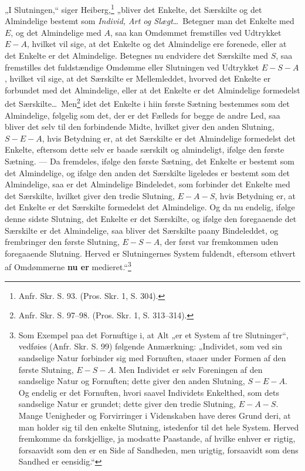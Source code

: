 \documentclass[11pt]{book}
\newcommand{\opage}[1]{\marginnote{\footnotesize\textit{[#1]}}}
\begin{document}
„I Slutningen,“ siger Heiberg,\footnote{Anfr. Skr. S. 93. (Pros. Skr.
1, S. 304).} „bliver det Enkelte, det Særskilte og det Almindelige
bestemt som \emph{Individ, Art og Slægt}\dots\ Betegner man det Enkelte
med $E$, og det Almindelige med $A$, saa kan Omdømmet fremstilles ved
Udtrykket $E - A$, hvilket vil sige, at det Enkelte og det Almindelige
ere forenede, eller at det Enkelte er det Almindelige. Betegnes nu
endvidere det Særskilte med $S$, saa fremstilles det fuldstændige
Omdømme eller Slutningen ved Udtrykket $E - S - A$, hvilket vil sige,
at det Særskilte er Mellemleddet, hvorved det Enkelte er forbundet med
det Almindelige, eller at det Enkelte er det Almindelige formedelst det
Særskilte\dots\ Men\footnote{Anfr. Skr. S. 97--98. (Pros. Skr. 1, S.
313--314).} idet det Enkelte i hiin første Sætning bestemmes som det
Almindelige, følgelig som det, der er det Fælleds for begge de andre
Led, saa bliver det selv til den forbindende Midte, hvilket giver den
anden Slutning, $S - E - A$, hvis Betydning er, at det Særskilte er det
Almindelige formedelst det Enkelte, eftersom dette selv er baade
særskilt og
\opage{215} \setcounter{footnote}{0}%
almindeligt, ifølge den første Sætning. --- Da fremdeles, ifølge den
første Sætning, det Enkelte er bestemt som det Almindelige, og ifølge
den anden det Særskilte ligeledes er bestemt som det Almindelige, saa
er det Almindelige Bindeledet, som forbinder det Enkelte med det
Særskilte, hvilket giver den tredie Slutning, $E - A - S$, hvis
Betydning er, at det Enkelte er det Særskilte formedelst det
Almindelige. Og da nu endelig, ifølge denne sidste Slutning, det
Enkelte er det Særskilte, og ifølge den foregaaende det Særskilte er
det Almindelige, saa bliver det Særskilte paany Bindeleddet, og
frembringer den første Slutning, $E - S - A$, der først var fremkommen
uden foregaaende Slutning. Herved er Slutningernes System fuldendt,
eftersom ethvert af Omdømmerne \textbf{nu er}
medieret.“\footnote{Som Exempel paa det Fornuftige i, at Alt „er et
System af tre Slutninger“, vedføies (Anfr. Skr. S. 99) følgende
Anmærkning: „Individet, som ved sin sandselige Natur forbinder sig med
Fornuften, staaer under Formen af den første Slutning, $E - S - A$. Men
Individet er selv Foreningen af den sandselige Natur og Fornuften;
dette giver den anden Slutning, $S - E - A$. Og endelig er det
Fornuften, hvori saavel Individets Enkelthed, som dets sandselige Natur
er grundet; dette giver den tredie Slutning, $E - A - S$. Mange
Uenigheder og Forvirringer i Videnskaben have deres Grund deri, at man
holder sig til den enkelte Slutning, istedenfor til det hele System.
Herved fremkomme da forskjellige, ja modsatte Paastande, af hvilke
enhver er rigtig, forsaavidt som den er en Side af Sandheden, men
urigtig, forsaavidt som dens Sandhed er eensidig.“}
\end{document}
